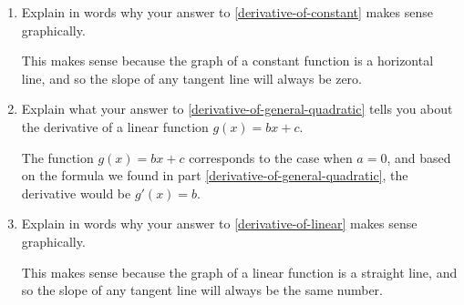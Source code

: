 \documentclass{article}
\begin{document}
\begin{enumerate}
\begin{enumerate}
    \begin{solution}
      Starting with the function $g(x)=ax^2+bx+c$, we get a constant function $g(x)=c$ if $a$ and $b$ are both zero.
      Based on the formula we found in part \ref{derivative-of-general-quadratic}, we can deduce that
      the derivative of a constant function is $g'(x)=0$.
    \end{solution}

  \item

    \begin{problem}[\vfill]
      Explain in words why your answer to \ref{derivative-of-constant} makes sense graphically.
    \end{problem}

    \begin{solution}
      This makes sense because the graph of a constant function is a horizontal line, and so the slope of any
      tangent line will always be zero.
    \end{solution}

  \item \label{derivative-of-linear}

    \begin{problem}[\vfill]
      Explain what your answer to \ref{derivative-of-general-quadratic} tells you about the derivative of a linear function $g(x) = bx + c$.%
    \end{problem}

    \begin{solution}
      The function $g(x)=bx+c$ corresponds to the case when $a=0$, and based on the formula we found in part 
      \ref{derivative-of-general-quadratic}, the derivative would be $g'(x)=b$. 
    \end{solution}

  \item

    \begin{problem}[\vfill\newpage]
      Explain in words why your answer to \ref{derivative-of-linear} makes sense graphically.
    \end{problem}

    \begin{solution}
      This makes sense because the graph of a linear function is a straight line, and so the slope of any tangent line
      will always be the same number.
    \end{solution}

  \end{enumerate}  


\end{enumerate}
\end{document}
